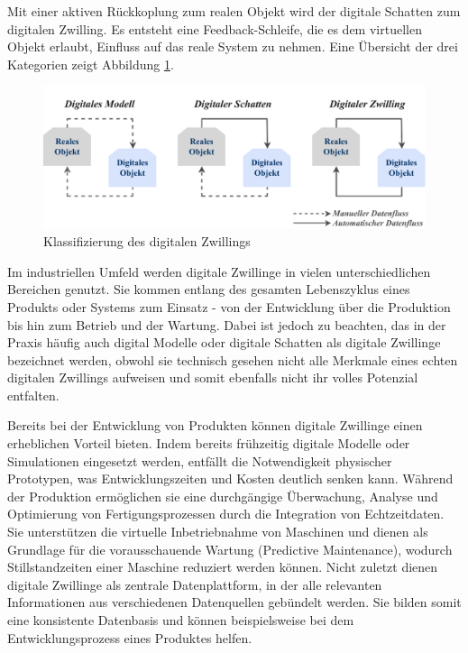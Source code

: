 Mit einer aktiven Rückkoplung zum realen Objekt wird der digitale Schatten zum digitalen Zwilling.
Es entsteht eine Feedback-Schleife, die es dem virtuellen Objekt erlaubt, Einfluss auf das reale System zu nehmen.
Eine Übersicht der drei Kategorien zeigt Abbildung \ref{fig:klassifizierungDT}. 
\vspace{-0.5em}
\begin{figure}[htbp]
    \centering
    \includegraphics[width=1\textwidth]{Bilder/klassifizierung_DT.pdf}
    \caption{Klassifizierung des digitalen Zwillings}
    \label{fig:klassifizierungDT}
\end{figure}
\vspace{-0.5em}

Im industriellen Umfeld werden digitale Zwillinge in vielen unterschiedlichen Bereichen genutzt.
Sie kommen entlang des gesamten Lebenszyklus eines Produkts oder Systems zum Einsatz - von der Entwicklung über die Produktion bis hin zum Betrieb und der Wartung. 
Dabei ist jedoch zu beachten, das in der Praxis häufig auch digital Modelle oder digitale Schatten als digitale Zwillinge bezeichnet werden, obwohl sie technisch gesehen nicht alle Merkmale eines echten digitalen Zwillings aufweisen und somit ebenfalls nicht ihr volles Potenzial entfalten.

Bereits bei der Entwicklung von Produkten können digitale Zwillinge einen erheblichen Vorteil bieten. 
Indem bereits frühzeitig digitale Modelle oder Simulationen eingesetzt werden, entfällt die Notwendigkeit physischer Prototypen, was Entwicklungszeiten und Kosten deutlich senken kann. Während der Produktion ermöglichen sie eine durchgängige Überwachung, Analyse und Optimierung von Fertigungsprozessen durch die Integration von Echtzeitdaten.
Sie unterstützen die virtuelle Inbetriebnahme von Maschinen und dienen als Grundlage für die vorausschauende Wartung (Predictive Maintenance), wodurch Stillstandzeiten einer Maschine reduziert werden können.
Nicht zuletzt dienen digitale Zwillinge als zentrale Datenplattform, in der alle relevanten Informationen aus verschiedenen Datenquellen gebündelt werden.
Sie bilden somit eine konsistente Datenbasis und können beispielsweise bei dem Entwicklungsprozess eines Produktes helfen. \cite{DTForSmartManufacturing}

